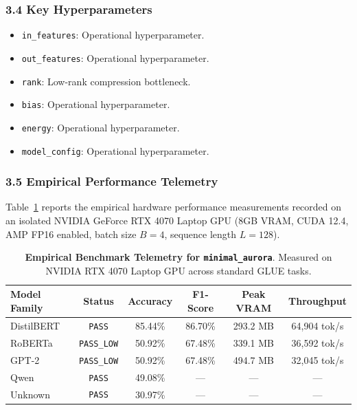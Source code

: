 \subsubsection*{3.4 Key Hyperparameters}
\begin{itemize}
    \item \texttt{in\_features}: Operational hyperparameter.
    \item \texttt{out\_features}: Operational hyperparameter.
    \item \texttt{rank}: Low-rank compression bottleneck.
    \item \texttt{bias}: Operational hyperparameter.
    \item \texttt{energy}: Operational hyperparameter.
    \item \texttt{model\_config}: Operational hyperparameter.
\end{itemize}

\subsubsection*{3.5 Empirical Performance Telemetry}
Table~\ref{tab:telemetry_minimal_aurora} reports the empirical hardware performance measurements recorded on an isolated NVIDIA GeForce RTX 4070 Laptop GPU (8GB VRAM, CUDA 12.4, AMP FP16 enabled, batch size $B=4$, sequence length $L=128$).

\begin{table}[h]
\centering
\small
\caption{\textbf{Empirical Benchmark Telemetry for \texttt{minimal\_aurora}}. Measured on NVIDIA RTX 4070 Laptop GPU across standard GLUE tasks.}
\label{tab:telemetry_minimal_aurora}
\begin{tabular*}{\columnwidth}{@{\extracolsep{\fill}}lccccc}
\toprule
\textbf{Model Family} & \textbf{Status} & \textbf{Accuracy} & \textbf{F1-Score} & \textbf{Peak VRAM} & \textbf{Throughput} \\
\midrule
DistilBERT & \texttt{PASS} & 85.44\% & 86.70\% & 293.2 MB & 64,904 tok/s \\
RoBERTa & \texttt{PASS\_LOW} & 50.92\% & 67.48\% & 339.1 MB & 36,592 tok/s \\
GPT-2 & \texttt{PASS\_LOW} & 50.92\% & 67.48\% & 494.7 MB & 32,045 tok/s \\
Qwen & \texttt{PASS} & 49.08\% & --- & --- & --- \\
Unknown & \texttt{PASS} & 30.97\% & --- & --- & --- \\
\bottomrule
\end{tabular*}
\end{table}

